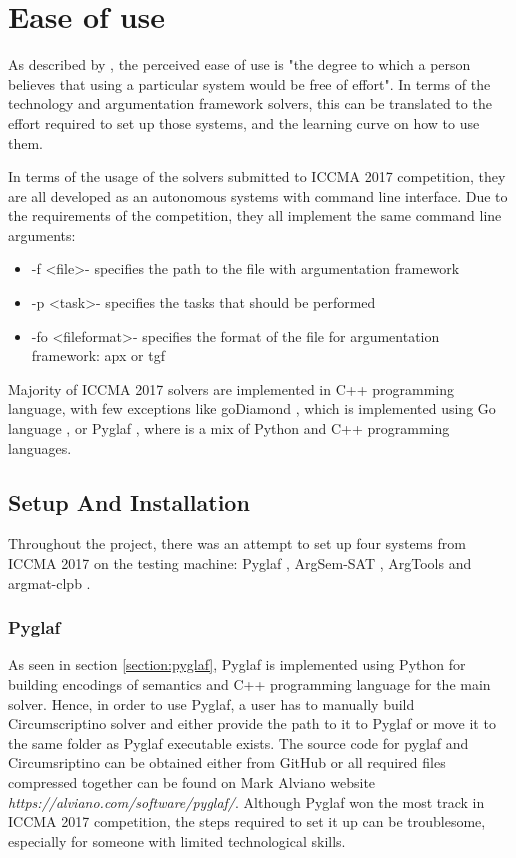 
\section{Ease of use}
As described by \citet{easeOfUse}, the perceived ease of use is "the degree to which a person believes that using a particular system would be free of effort". In terms of the technology and argumentation framework solvers, this can be translated to the effort required to set up those systems, and the learning curve on how to use them. 

In terms of the usage of the solvers submitted to ICCMA 2017 competition, they are all developed as an autonomous systems with command line interface. Due to the requirements of the competition, they all implement the same command line arguments:

\begin{itemize}
	\item -f \textless file\textgreater - specifies the path to the file with argumentation framework
	\item -p \textless task\textgreater - specifies the tasks that should be performed
	\item -fo \textless fileformat\textgreater - specifies the format of the file for argumentation framework: apx or tgf
\end{itemize}

Majority of ICCMA 2017 solvers are implemented in C++ programming language, with few exceptions like goDiamond \citep{goDiamond}, which is implemented using Go language \citep{GoLang}, or Pyglaf \citep{pyglaf}, where is a mix of Python and C++ programming languages. 



\subsection{Setup And Installation}
Throughout the project, there was an attempt to set up four systems from ICCMA 2017 on the testing machine: Pyglaf \citep{pyglaf}, ArgSem-SAT \citep{argsemsat}, ArgTools \citep{argtools} and argmat-clpb \citep{argmat-clpb}. 

\subsubsection{Pyglaf}
As seen in section \ref{section:pyglaf}, Pyglaf is implemented using Python for building encodings of semantics and C++ programming language for the main solver. Hence, in order to use Pyglaf, a user has to manually build Circumscriptino \citep{circumscriptino} solver and either provide the path to it to Pyglaf or move it to the same folder as Pyglaf executable exists. The source code for pyglaf and Circumsriptino can be obtained either from GitHub or all required files compressed together can be found on Mark Alviano website \textit{https://alviano.com/software/pyglaf/}. Although Pyglaf won the most track in ICCMA 2017 competition, the steps required to set it up can be troublesome, especially for someone with limited technological skills. 

